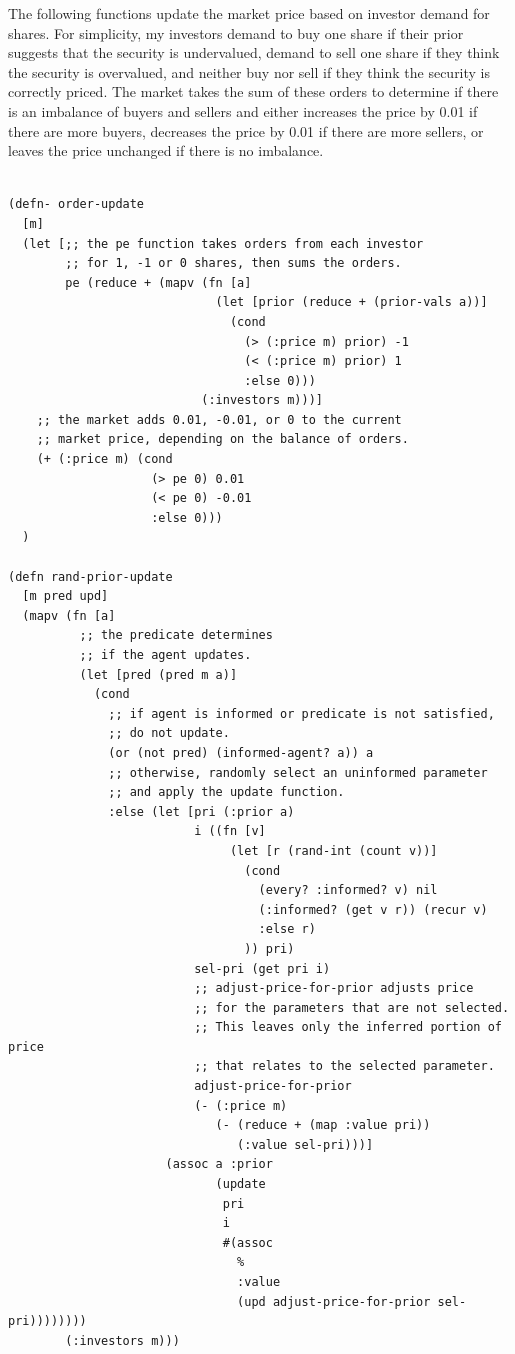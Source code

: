 \documentclass[11pt]{article}
\begin{document}
The following functions update the market price based on investor demand for shares. For simplicity, my investors demand to buy one share if their prior suggests that the security is undervalued, demand to sell one share if they think the security is overvalued, and neither buy nor sell if they think the security is correctly priced. The market takes the sum of these orders to determine if there is an imbalance of buyers and sellers and either increases the price by 0.01 if there are more buyers, decreases the price by 0.01 if there are more sellers, or leaves the price unchanged if there is no imbalance.

\singlespacing
\lstset{language=Lisp,label= ,caption= ,captionpos=b,numbers=none}
\begin{lstlisting}

(defn- order-update
  [m]
  (let [;; the pe function takes orders from each investor
        ;; for 1, -1 or 0 shares, then sums the orders.
        pe (reduce + (mapv (fn [a]
                             (let [prior (reduce + (prior-vals a))]
                               (cond
                                 (> (:price m) prior) -1
                                 (< (:price m) prior) 1
                                 :else 0)))
                           (:investors m)))]
    ;; the market adds 0.01, -0.01, or 0 to the current
    ;; market price, depending on the balance of orders.
    (+ (:price m) (cond
                    (> pe 0) 0.01
                    (< pe 0) -0.01
                    :else 0)))
  )

(defn rand-prior-update
  [m pred upd]
  (mapv (fn [a]
          ;; the predicate determines
          ;; if the agent updates.
          (let [pred (pred m a)] 
            (cond
              ;; if agent is informed or predicate is not satisfied,
              ;; do not update.
              (or (not pred) (informed-agent? a)) a
              ;; otherwise, randomly select an uninformed parameter
              ;; and apply the update function.
              :else (let [pri (:prior a)
                          i ((fn [v]
                               (let [r (rand-int (count v))]
                                 (cond
                                   (every? :informed? v) nil
                                   (:informed? (get v r)) (recur v)
                                   :else r)
                                 )) pri)
                          sel-pri (get pri i)
                          ;; adjust-price-for-prior adjusts price 
                          ;; for the parameters that are not selected.
                          ;; This leaves only the inferred portion of price
                          ;; that relates to the selected parameter.
                          adjust-price-for-prior
                          (- (:price m) 
                             (- (reduce + (map :value pri))
                                (:value sel-pri)))]
                      (assoc a :prior
                             (update
                              pri
                              i
                              #(assoc
                                %
                                :value
                                (upd adjust-price-for-prior sel-pri))))))))
        (:investors m)))


\end{lstlisting}
\end{document}
